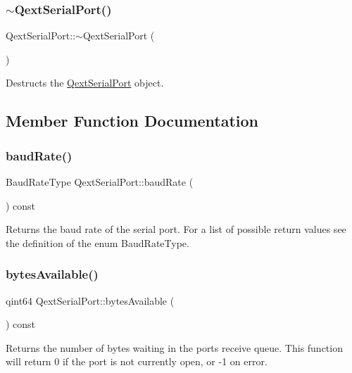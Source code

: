 \subsubsection{\texorpdfstring{$\sim$\+Qext\+Serial\+Port()}{~QextSerialPort()}}
{\footnotesize\ttfamily Qext\+Serial\+Port\+::$\sim$\+Qext\+Serial\+Port (\begin{DoxyParamCaption}{ }\end{DoxyParamCaption})}

Destructs the \hyperlink{classQextSerialPort}{Qext\+Serial\+Port} object. 

\subsection{Member Function Documentation}
\mbox{\label{classQextSerialPort_a6ff8552e67d0de8036c8827bee8298c5}} 
\subsubsection{\texorpdfstring{baud\+Rate()}{baudRate()}}
{\footnotesize\ttfamily Baud\+Rate\+Type Qext\+Serial\+Port\+::baud\+Rate (\begin{DoxyParamCaption}{ }\end{DoxyParamCaption}) const}

Returns the baud rate of the serial port. For a list of possible return values see the definition of the enum Baud\+Rate\+Type. \mbox{\label{classQextSerialPort_a7a3d641c3cd4810f9f70c4c86c2fc5e7}} 
\subsubsection{\texorpdfstring{bytes\+Available()}{bytesAvailable()}}
{\footnotesize\ttfamily qint64 Qext\+Serial\+Port\+::bytes\+Available (\begin{DoxyParamCaption}{ }\end{DoxyParamCaption}) const}

Returns the number of bytes waiting in the port\textquotesingle{}s receive queue. This function will return 0 if the port is not currently open, or -\/1 on error. \mbox{\label{classQextSerialPort_adafee990c20d75276a9c94ad221cd851}} 

